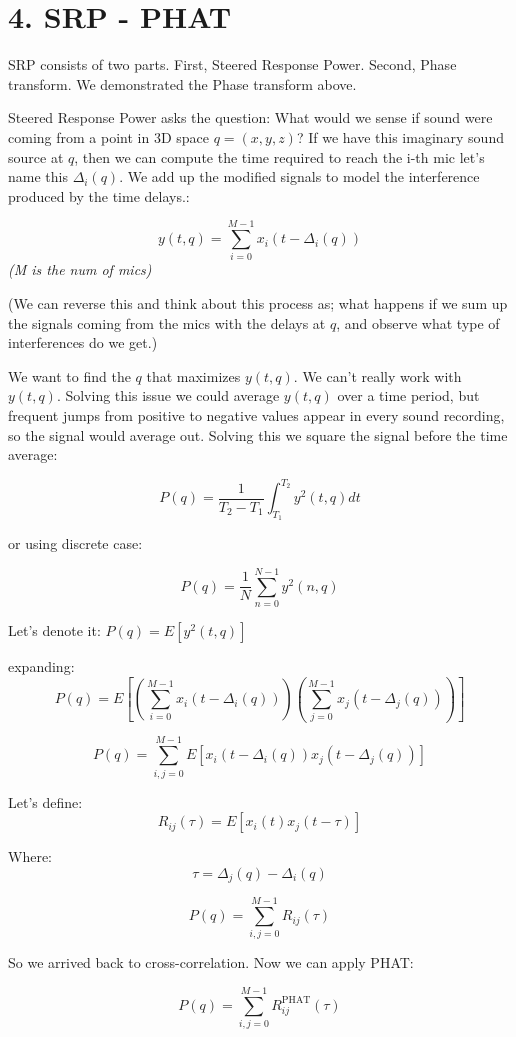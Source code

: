 \documentclass{article}
\begin{document}
\section*{4. SRP - PHAT}

SRP consists of two parts. First, Steered Response Power. Second, Phase transform. We demonstrated the Phase transform above.

Steered Response Power asks the question: What would we sense if sound were coming from a point in 3D space $q=(x,y,z)$?
If we have this imaginary sound source at $q$, then we can compute the time required to reach the i-th mic let's name this $\Delta_i(q)$. We add up the modified signals to model the interference produced by the time delays.:

\[
y(t,q) = \sum_{i=0}^{M-1} x_i(t - \Delta_i(q))
\]
\textit{(M is the num of mics)}

(We can reverse this and think about this process as; what happens if we sum up the signals coming from the mics with the delays at $q$, and observe what type of interferences do we get.)

We want to find the $q$ that maximizes $y(t,q)$.
We can't really work with $y(t,q)$. Solving this issue we could average $y(t,q)$ over a time period, but frequent jumps from positive to negative values appear in every sound recording, so the signal would average out. Solving this we square the signal before the time average:

\[
P(q) = \frac{1}{T_2 - T_1} \int_{T_1}^{T_2} y^2(t,q) dt
\]

or using discrete case:

\[
P(q) = \frac{1}{N} \sum_{n=0}^{N-1} y^2(n, q)
\]

Let's denote it: $P(q) = E[y^2(t,q)]$

expanding:
\[
P(q) = E\left[ \left( \sum_{i=0}^{M-1} x_i(t - \Delta_i(q)) \right) \left( \sum_{j=0}^{M-1} x_j(t - \Delta_j(q)) \right) \right]
\]

\[
P(q) = \sum_{i,j=0}^{M-1} E\left[ x_i(t - \Delta_i(q)) x_j(t - \Delta_j(q)) \right]
\]

Let's define:
\[
R_{ij}(\tau) = E[x_i(t) x_j(t - \tau)]
\]

Where:
\[
\tau = \Delta_j(q) - \Delta_i(q)
\]

\[
P(q) = \sum_{i,j=0}^{M-1} R_{ij}(\tau)
\]

So we arrived back to cross-correlation.
Now we can apply PHAT:

\[
P(q) = \sum_{i,j=0}^{M-1} R_{ij}^{\text{PHAT}}(\tau)
\]
\end{document}
